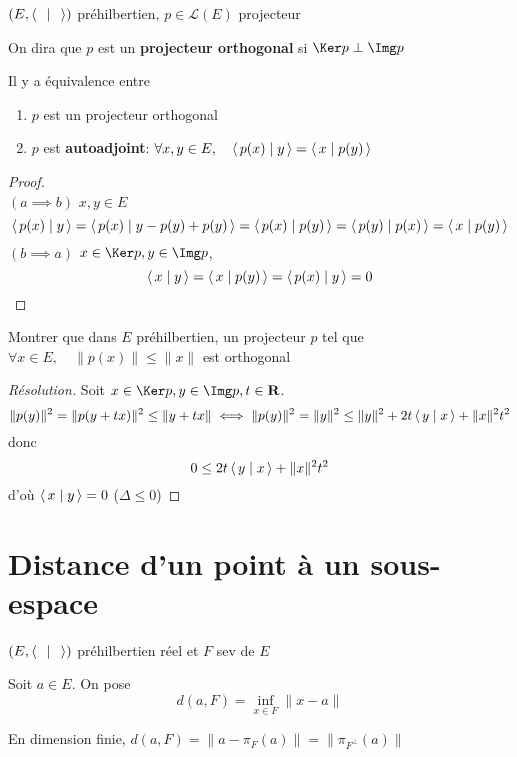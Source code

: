 \begin{defprop}
    \Hyp $(E, \scalar{\;}{\;} )$ préhilbertien, $p \in  \mathcal  L(E)$ projecteur
    \begin{concenum}
    \item On dira que $p$ est un \textbf{projecteur orthogonal} si $\Ker p\perp \Img p$
    \item Il y a équivalence entre  \begin{enumerate}
        \item $p$ est un projecteur orthogonal
        \item $p$ est \textbf{autoadjoint}:  $\forall  x, y \in  E, \quad  \scalar{p(x)}{y}= \scalar{x}{p(y)}  $
    \end{enumerate}
    \end{concenum}
\end{defprop}

\begin{proof}~\\
    $(a\implies b)$ $x, y \in  E$ \[
        \scalar{p(x)}{y} = \scalar{p(x)}{y-p(y)+p(y)} =\scalar{p(x)}{p(y)} =\scalar{p(y)}{p(x)} =\scalar{x}{p(y)} 
    \] 
    $(b\implies a)$ $x \in  \Ker p, y \in  \Img p$, \[
        \scalar{x}{y} = \scalar{x}{p(y)} = \scalar{p(x)}{y}=0
    \]
\end{proof}

\begin{exo}
    Montrer que dans $E$ préhilbertien, un projecteur $p$ tel que  $\forall  x \in  E, \quad  \|p(x)\|\leq \|x\|$ est orthogonal
\end{exo}

\begin{proof}[Résolution]
Soit $x \in  \Ker p, y \in  \Img p, t \in  \R$. \[
    \|p(y)\|^2 =\|p(y+tx)\|^2 \leq \|y+tx\| \iff  \|p(y)\|^2=\|y\|^2  \leq \|y\|^2 +2t \scalar{y}{x} + \|x\|^2 t ^2 
\] 
donc  \[
    0\leq 2t \scalar{y}{x} + \|x\|^2 t^2
\] 
d'où $\scalar{x}{y} =0$ ($\Delta\leq 0$)
\end{proof}

\section{Distance d'un point à un sous-espace}

\begin{thmdef}
    \Hyp $(E, \scalar{\;}{\;} )$ préhilbertien réel et $F$ sev de $E$
    \begin{concenum}
    \item Soit $a \in  E$. On pose \[
            d(a, F)=\inf_{x \in  F} \|x-a\|
    \] 
\item En dimension finie, $d(a, F)=\|a-\pi_F(a)\|=\|\pi_{F^\perp}(a)\|$
    \end{concenum}
\end{thmdef}

